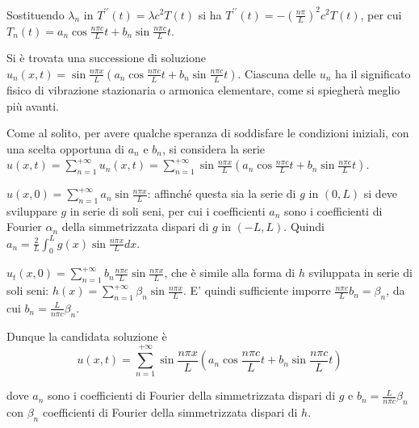 \documentclass{article}
\begin{document}
Sostituendo $\lambda _{n}$ in $T^{\prime \prime }\left( t\right) =\lambda
c^{2}T\left( t\right) $ si ha $T^{\prime \prime }\left( t\right) =-\left( 
\frac{n\pi }{L}\right) ^{2}c^{2}T\left( t\right) $, per cui $T_{n}\left(
t\right) =a_{n}\cos \frac{n\pi c}{L}t+b_{n}\sin \frac{n\pi c}{L}t$.

Si \`{e} trovata una successione di soluzione $u_{n}\left( x,t\right) =\sin 
\frac{n\pi x}{L}\left( a_{n}\cos \frac{n\pi c}{L}t+b_{n}\sin \frac{n\pi c}{L}%
t\right) $. Ciascuna delle $u_{n}$ ha il significato fisico di vibrazione
stazionaria o armonica elementare, come si spiegher\`{a} meglio pi\`{u}
avanti.

Come al solito, per avere qualche speranza di soddisfare le condizioni
iniziali, con una scelta opportuna di $a_{n}$ e $b_{n}$, si considera la
serie $u\left( x,t\right) =\sum_{n=1}^{+\infty }u_{n}\left( x,t\right)
=\sum_{n=1}^{+\infty }\sin \frac{n\pi x}{L}\left( a_{n}\cos \frac{n\pi c}{L}%
t+b_{n}\sin \frac{n\pi c}{L}t\right) $.

$u\left( x,0\right) =\sum_{n=1}^{+\infty }a_{n}\sin \frac{n\pi x}{L}$:
affinch\'{e} questa sia la serie di $g$ in $\left( 0,L\right) $ si deve
sviluppare $g$ in serie di soli seni, per cui i coefficienti $a_{n}$ sono i
coefficienti di Fourier $\alpha _{n}$ della simmetrizzata dispari di $g$ in $%
\left( -L,L\right) $. Quindi $a_{n}=\frac{2}{L}\int_{0}^{L}g\left( x\right)
\sin \frac{n\pi x}{L}dx$.

$u_{t}\left( x,0\right) =\sum_{n=1}^{+\infty }b_{n}\frac{n\pi c}{L}\sin 
\frac{n\pi x}{L}$, che \`{e} simile alla forma di $h$ sviluppata in serie di
soli seni: $h\left( x\right) =\sum_{n=1}^{+\infty }\beta _{n}\sin \frac{n\pi
x}{L}$. E' quindi sufficiente imporre $\frac{n\pi c}{L}b_{n}=\beta _{n}$, da
cui $b_{n}=\frac{L}{n\pi c}\beta _{n}$.

Dunque la candidata soluzione \`{e} 
\begin{equation*}
u\left( x,t\right) =\sum_{n=1}^{+\infty }\sin \frac{n\pi x}{L}\left(
a_{n}\cos \frac{n\pi c}{L}t+b_{n}\sin \frac{n\pi c}{L}t\right)
\end{equation*}

dove $a_{n}$ sono i coefficienti di Fourier della simmetrizzata dispari di $%
g $ e $b_{n}=\frac{L}{n\pi c}\beta _{n}$ con $\beta _{n}$ coefficienti di
Fourier della simmetrizzata dispari di $h$.
\end{document}
